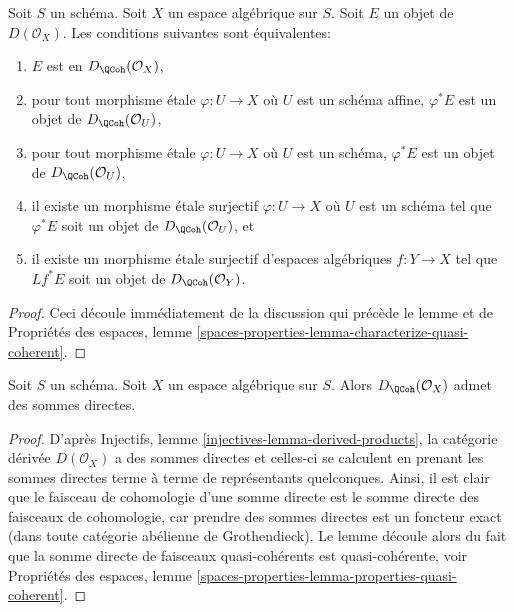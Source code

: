 \begin{lemma}
\label{lemma-check-quasi-coherence-on-covering}
Soit $S$ un schéma. Soit $X$ un espace algébrique sur $S$.
Soit $E$ un objet de $D(\mathcal{O}_X)$. Les conditions suivantes sont équivalentes:
\begin{enumerate}
\item $E$ est en $D_\QCoh(\mathcal{O}_X)$,
\item pour tout morphisme \'etale $\varphi : U \to X$ où $U$ est un
schéma affine, $\varphi^*E$ est un objet de
$D_\QCoh(\mathcal{O}_U)$,
\item pour tout morphisme \'etale $\varphi : U \to X$ où $U$ est un schéma,
$\varphi^*E$ est un objet de
$D_\QCoh(\mathcal{O}_U)$,
\item il existe un morphisme \'etale surjectif $\varphi : U \to X$
où $U$ est un schéma tel que $\varphi^*E$ soit un objet de
$D_\QCoh(\mathcal{O}_U)$, et
\item il existe un morphisme \'etale surjectif d'espaces algébriques
$f : Y \to X$ tel que $Lf^*E$ soit un objet de
$D_\QCoh(\mathcal{O}_Y)$.
\end{enumerate}
\end{lemma}

\begin{proof}
Ceci découle immédiatement de la discussion qui précède le lemme et de
Propriétés des espaces, lemme
\ref{spaces-properties-lemma-characterize-quasi-coherent}.
\end{proof}

\begin{lemma}
\label{lemma-quasi-coherence-direct-sums}
Soit $S$ un schéma. Soit $X$ un espace algébrique sur $S$.
Alors $D_\QCoh(\mathcal{O}_X)$ admet des sommes directes.
\end{lemma}

\begin{proof}
D'après Injectifs, lemme \ref{injectives-lemma-derived-products},
la catégorie dérivée $D(\mathcal{O}_X)$ a des sommes directes et
celles-ci se calculent en prenant les sommes directes terme à terme de représentants quelconques.
Ainsi, il est clair que le faisceau de cohomologie d'une somme directe est le
somme directe des faisceaux de cohomologie, car prendre des sommes directes est
un foncteur exact (dans toute catégorie abélienne de Grothendieck).
Le lemme découle alors du fait que la somme directe de faisceaux quasi-cohérents est quasi-cohérente, voir
Propriétés des espaces, lemme
\ref{spaces-properties-lemma-properties-quasi-coherent}.
\end{proof}

